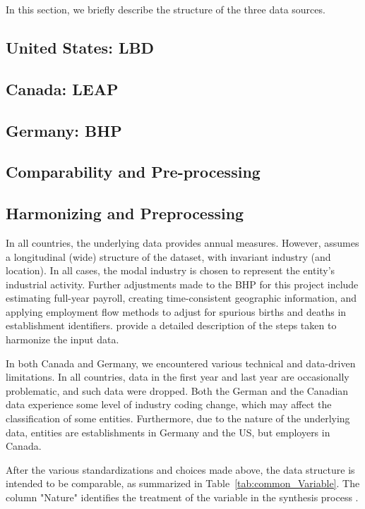 
In this section, we briefly describe the structure of the three data sources.%

\subsection{United States: \acf{LBD}}



\subsection{Canada: \acf{LEAP}}



\subsection{Germany: \acf{BHP}}



\subsection{Comparability and Pre-processing}

\subsection{Harmonizing and Preprocessing}

In all countries, the underlying data provides annual measures. However, \SynLBD{} assumes a longitudinal (wide) structure of the dataset, with invariant industry (and location). In all cases, the modal industry is chosen to represent the entity's industrial activity. 
%
Further adjustments made to the \ac{BHP} for this project include estimating full-year payroll, creating time-consistent geographic information, and applying employment flow methods \citep{RePEc:iab:iabfme:201006_en} to adjust for spurious births and deaths in establishment identifiers. \citet{SJIAOS-2014b} provide a detailed description of the steps taken to harmonize the input data. 


In both Canada and Germany, we encountered various technical and data-driven limitations. In all countries, data in the first year and last year are occasionally problematic, and such data  were dropped. 
%
Both the German and the Canadian data experience some level of industry coding change, which may affect the classification of some entities. Furthermore, due to the nature of the underlying data, entities are establishments in Germany and the US, but employers in Canada. 

After the various standardizations and choices made above, the data structure is intended to be comparable, as summarized in Table~\ref{tab:common_Variable}. The column "Nature" identifies the treatment of the variable in the synthesis process \SynLBD. 

%


